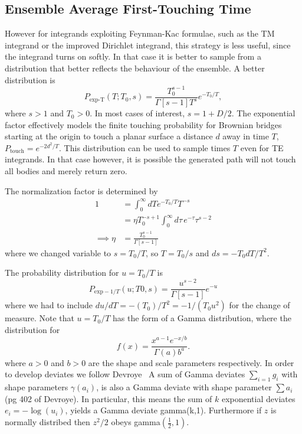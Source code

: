 \subsection{Ensemble Average First-Touching Time}

However for integrands exploiting Feynman-Kac formulae, such as the TM integrand or 
the improved Dirichlet integrand, this strategy is less useful, since the integrand turns on softly.
In that case it is better to sample from a distribution
that better reflects the behaviour of the ensemble.
  A better distribution is 
\begin{equation}
  P_{\text{exp-T}}(T;T_0,s) = \frac{T_0^{s-1}}{\Gamma[s-1] T^s}e^{-T_0/T}\label{eq:expT},
\end{equation}
where $s>1$ and $T_0>0$.  In most cases of interest, $s=1+D/2$.  The exponential factor effectively models the finite touching 
probability for Brownian bridges starting at the origin to touch a planar surface a distance $d$ 
away in time $T$, $P_\text{touch}=e^{-2d^2/T}$.   This distribution can be used to sample times $T$
even for TE integrands.  In that case however, it is possible the generated path will not
touch all bodies and merely return zero.    

The normalization factor is determined by
\begin{align}
   1&= \int_0^\infty dT e^{-T_0/T} T^{-s}\\
  &= \eta T_0^{-s+1}\int_0^\infty d\tau\, e^{-\tau}\tau^{s-2}\\
 \implies \eta &= \frac{T_0^{s-1}}{\Gamma[s-1]}
\end{align}
where we changed variable to $s=T_0/T$, so $T=T_0/s$ and $ds=-T_0 dT/T^2$.  

The probability distribution for $u=T_0/T$ is 
\begin{equation}
  P_{\text{exp}-1/T}(u;T0,s) = \frac{u^{s-2}}{\Gamma[s-1]}e^{-u}
\end{equation}
where we had to include $du/dT= -(T_0)/T^2=-1/(T_0u^2)$ for the change
of measure.  
Note that $u=T_0/T$ has the form of a Gamma distribution, where the distribution for   
\begin{equation}
  f(x) = \frac{x^{a-1} e^{-x/b}}{\Gamma(a)b^a}.  
\end{equation}
where $a>0$ and $b>0$ are the shape and scale parameters respectively.  
In order to develop deviates we follow Devroye~\cite{Devroye2003}
A sum of Gamma deviates $\sum_{i=1}g_i$ with shape parameters $\gamma(a_i)$, is also a Gamma deviate
with shape parameter $\sum a_i$ (pg 402 of Devroye).  
In particular, this means the sum of $k$ exponential deviates $e_i=-\log(u_i)$, yields a Gamma 
deviate gamma(k,1).  Furthermore if $z$ is normally distribed then $z^2/2$ obeys gamma$\left(\frac{1}{2},1\right)$.


